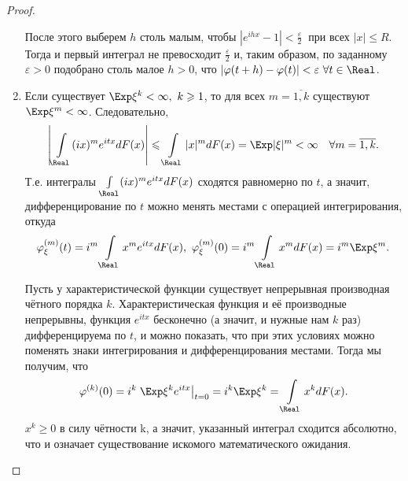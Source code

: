 \begin{proof}
\begin{enumerate}
            После этого выберем $h$ столь малым, чтобы $\left|e^{i h x}-1\right|<\frac{\varepsilon}{2}~$ при всех $|x| \leqslant R$. 
            Тогда и первый интеграл не превосходит $\frac{\varepsilon}{2}$ и, таким образом, по заданному $\varepsilon > 0$ подобрано столь малое $h >0$, что ${|\varphi(t+h)-\varphi(t)|<\varepsilon~ \forall t \in \Real}$.
        \item 
            Если существует $\Exp \xi^{k}<\infty,~ k \geqslant 1$, то для всех $m = \overline{1, k}$ существуют $\Exp \xi^{m}<\infty$. Следовательно,
            \begin{equation*}
                \left|\int\limits_{\Real}(i x)^{m} e^{i t x} d F(x)\right| \leqslant \int\limits_{\Real}|x|^{m} d F(x)=\Exp |\xi|^{m}<\infty \quad \forall m = \overline{1, k}.
            \end{equation*}
            Т.е. интегралы $\int\limits_{\Real}(i x)^{m} e^{i t x} d F(x)$ сходятся равномерно по $t$, а значит, дифференцирование по $t$ можно менять местами с операцией интегрирования, откуда
            \begin{equation*}
                \varphi_{\xi}^{(m)}(t)=i^{m} \int\limits_{\Real} x^{m} e^{i t x} d F(x),~ \varphi_{\xi}^{(m)}(0)=i^{m} \int\limits_{\Real} x^{m} d F(x)=i^{m} \Exp \xi^{m}.
            \end{equation*}
            
            Пусть у характеристической функции существует непрерывная производная чётного порядка $k$. 
            Характеристическая функция и её производные непрерывны, функция $e^{itx}$ бесконечно (а значит, и нужные нам $k$ раз) дифференцируема по $t$, 
            и можно показать, что при этих условиях можно поменять знаки интегрирования и дифференцирования местами.
            Тогда мы получим, что
            \begin{equation*}
                \varphi^{(k)}(0) = i^k \left.\Exp \xi^k e^{itx}\right|_{t=0} = i^k \Exp \xi^k = 
            \int\limits_{\Real} x^k dF(x).
            \end{equation*}
            $x^k \geqslant 0$ в силу чётности k, а значит, указанный интеграл сходится абсолютно, что и означает существование искомого математического ожидания.
    \end{enumerate}
\end{proof}